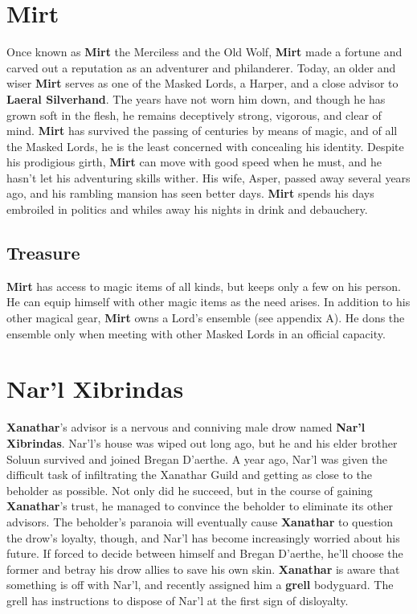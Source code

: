\documentclass[10pt,a4paper,twoside,twocolumn,openany,nodeprecatedcode]{dndbook}
\begin{document}
\section{Mirt}
Once known as \textbf{Mirt} the Merciless and the Old Wolf, \textbf{Mirt} made a fortune and carved out a reputation as an adventurer and philanderer. Today, an older and wiser \textbf{Mirt} serves as one of the Masked Lords, a Harper, and a close advisor to \textbf{Laeral Silverhand}. The years have not worn him down, and though he has grown soft in the flesh, he remains deceptively strong, vigorous, and clear of mind. \textbf{Mirt} has survived the passing of centuries by means of magic, and of all the Masked Lords, he is the least concerned with concealing his identity.
Despite his prodigious girth, \textbf{Mirt} can move with good speed when he must, and he hasn't let his adventuring skills wither. His wife, Asper, passed away several years ago, and his rambling mansion has seen better days. \textbf{Mirt} spends his days embroiled in politics and whiles away his nights in drink and debauchery.
\subsection{Treasure}
\textbf{Mirt} has access to magic items of all kinds, but keeps only a few on his person. He can equip himself with other magic items as the need arises.
In addition to his other magical gear, \textbf{Mirt} owns a Lord's ensemble (see appendix A). He dons the ensemble only when meeting with other Masked Lords in an official capacity.
\section{Nar'l Xibrindas}
\textbf{Xanathar}'s advisor is a nervous and conniving male drow named \textbf{Nar'l Xibrindas}. Nar'l's house was wiped out long ago, but he and his elder brother Soluun survived and joined Bregan D'aerthe. A year ago, Nar'l was given the difficult task of infiltrating the Xanathar Guild and getting as close to the beholder as possible. Not only did he succeed, but in the course of gaining \textbf{Xanathar}'s trust, he managed to convince the beholder to eliminate its other advisors. The beholder's paranoia will eventually cause \textbf{Xanathar} to question the drow's loyalty, though, and Nar'l has become increasingly worried about his future. If forced to decide between himself and Bregan D'aerthe, he'll choose the former and betray his drow allies to save his own skin.
\textbf{Xanathar} is aware that something is off with Nar'l, and recently assigned him a \textbf{grell} bodyguard. The grell has instructions to dispose of Nar'l at the first sign of disloyalty.
\end{document}
